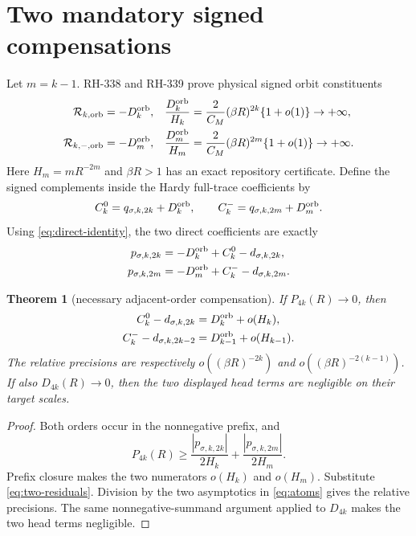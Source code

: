 \documentclass[11pt]{article}
\newtheorem{theorem}{Theorem}[section]
\theoremstyle{remark}
\newcommand{\cR}{\mathcal R}
\begin{document}
\section{Two mandatory signed compensations}

Let $m=k-1$.  RH-338 and RH-339 prove physical signed orbit constituents
\begin{align}\label{eq:atoms}
 \cR_{k,\mathrm{orb}}&=-D_k^{\rm orb},&
 \frac{D_k^{\rm orb}}{H_k}
 &=\frac{2}{C_M}(\beta R)^{2k}\{1+o(1)\}\to+\infty,\\
 \cR_{k,-,\mathrm{orb}}&=-D_m^{\rm orb},&
 \frac{D_m^{\rm orb}}{H_m}
 &=\frac{2}{C_M}(\beta R)^{2m}\{1+o(1)\}\to+\infty.
\end{align}
Here $H_m=mR^{-2m}$ and $\beta R>1$ has an exact repository certificate.
Define the signed complements inside the Hardy full-trace coefficients by
\begin{equation}\label{eq:complements}
 C_k^0=q_{\sigma,k,2k}+D_k^{\rm orb},
 \qquad
 C_k^-=q_{\sigma,k,2m}+D_m^{\rm orb}.
\end{equation}
Using \eqref{eq:direct-identity}, the two direct coefficients are exactly
\begin{align}\label{eq:two-residuals}
 p_{\sigma,k,2k}&=-D_k^{\rm orb}+C_k^0-d_{\sigma,k,2k},\\
 p_{\sigma,k,2m}&=-D_m^{\rm orb}+C_k^- -d_{\sigma,k,2m}.
\end{align}

\begin{theorem}[necessary adjacent-order compensation]
If $P_{4k}(R)\to0$, then
\begin{align}\label{eq:compensations}
 C_k^0-d_{\sigma,k,2k}&=D_k^{\rm orb}+o(H_k),\\
 C_k^- -d_{\sigma,k,2k-2}&=D_{k-1}^{\rm orb}+o(H_{k-1}).
\end{align}
The relative precisions are respectively
$o((\beta R)^{-2k})$ and $o((\beta R)^{-2(k-1)})$.  If also
$D_{4k}(R)\to0$, then the two displayed head terms are negligible on their
target scales.
\end{theorem}
\begin{proof}
Both orders occur in the nonnegative prefix, and
\[
 P_{4k}(R)\ge
 \frac{|p_{\sigma,k,2k}|}{2H_k}
 +\frac{|p_{\sigma,k,2m}|}{2H_m}.
\]
Prefix closure makes the two numerators $o(H_k)$ and $o(H_m)$.
Substitute \eqref{eq:two-residuals}.  Division by the two asymptotics in
\eqref{eq:atoms} gives the relative precisions.  The same
nonnegative-summand argument applied to $D_{4k}$ makes the two head terms
negligible.
\end{proof}
\end{document}
